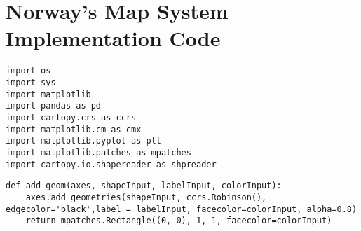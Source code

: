 \chapter{Norway's Map System Implementation Code}
\label{MapNOR}
\begin{lstlisting}
import os
import sys
import matplotlib
import pandas as pd
import cartopy.crs as ccrs
import matplotlib.cm as cmx
import matplotlib.pyplot as plt
import matplotlib.patches as mpatches
import cartopy.io.shapereader as shpreader
\end{lstlisting}

\begin{lstlisting}
def add_geom(axes, shapeInput, labelInput, colorInput):
	axes.add_geometries(shapeInput, ccrs.Robinson(), edgecolor='black',label = labelInput, facecolor=colorInput, alpha=0.8)
	return mpatches.Rectangle((0, 0), 1, 1, facecolor=colorInput)
\end{lstlisting}

